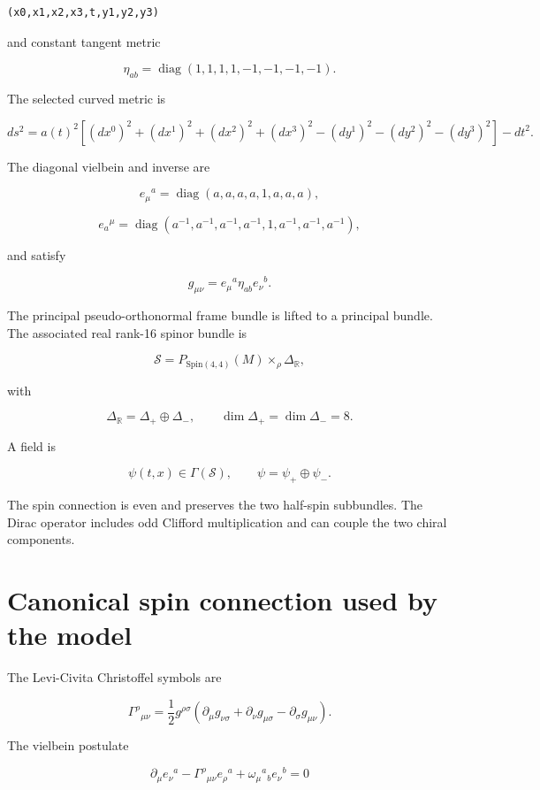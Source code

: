 \documentclass[11pt]{article}
\begin{document}
\begin{Verbatim}[fontsize=\small]
(x0,x1,x2,x3,t,y1,y2,y3)
\end{Verbatim}

and constant tangent metric

\[
\eta_{ab}=\operatorname{diag}(1,1,1,1,-1,-1,-1,-1).
\]

The selected curved metric is

\[
 ds^2=a(t)^2\left[(dx^0)^2+(dx^1)^2+(dx^2)^2+(dx^3)^2
 -(dy^1)^2-(dy^2)^2-(dy^3)^2\right]-dt^2.
\]

The diagonal vielbein and inverse are

\[
e_\mu{}^a=\operatorname{diag}(a,a,a,a,1,a,a,a),
\]

\[
e_a{}^\mu=\operatorname{diag}(a^{-1},a^{-1},a^{-1},a^{-1},1,
 a^{-1},a^{-1},a^{-1}),
\]

and satisfy

\[
g_{\mu\nu}=e_\mu{}^a\eta_{ab}e_\nu{}^b.
\]

The principal pseudo-orthonormal frame bundle is lifted to a principal \texttt{} bundle. The associated real rank-16 spinor bundle is

\[
\mathcal S=P_{\mathrm{Spin}(4,4)}(M)
\mathbin{\times}_\rho\Delta_{\mathbb R},
\]

with

\[
\Delta_{\mathbb R}=\Delta_+\oplus\Delta_-,
\qquad \dim\Delta_+=\dim\Delta_-=8.
\]

A field is

\[
\psi(t,x)\in\Gamma(\mathcal S),
\qquad
\psi=\psi_+\oplus\psi_-.
\]

The spin connection is even and preserves the two half-spin subbundles. The Dirac operator includes odd Clifford multiplication and can couple the two chiral components.

\section{Canonical spin connection used by the model}

The Levi-Civita Christoffel symbols are

\[
\Gamma^\rho{}_{\mu\nu}
=\frac12g^{\rho\sigma}
\left(\partial_\mu g_{\nu\sigma}
+\partial_\nu g_{\mu\sigma}
-\partial_\sigma g_{\mu\nu}\right).
\]

The vielbein postulate

\[
\partial_\mu e_\nu{}^a
-\Gamma^\rho{}_{\mu\nu}e_\rho{}^a
+\omega_\mu{}^a{}_b e_\nu{}^b=0
\]
\end{document}
